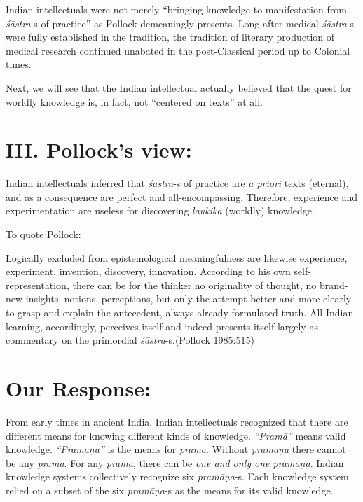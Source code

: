 Indian intellectuals were not merely ``bringing knowledge to manifestation from {\sl śāstra}-s of practice'' as Pollock demeaningly presents.  Long after medical {\sl śāstra}-s were fully established in the tradition, the tradition of literary production of medical research continued unabated in the post-Classical period up to Colonial times.

\newpage

Next, we will see that the Indian intellectual actually believed that the quest for worldly knowledge is, in fact, not ``centered on texts'' at all.

\section*{III. Pollock's view:}

Indian intellectuals inferred that {{\sl śāstra}\relax}-s of practice are {\sl a priori} texts (eternal), and as a consequence are perfect and all-encompassing.  Therefore, experience and experimentation are useless for discovering {{\sl laukika}\relax} (worldly) knowledge.

To quote Pollock:
\begin{myquote}
Logically excluded from epistemological meaningfulness are likewise experience, experiment, invention, discovery, innovation.  According to his own self-representation, there can be for the thinker no originality of thought, no brand-new insights, notions, perceptions, but only the attempt better and more clearly to grasp and explain the antecedent, always already formulated truth. All Indian learning, accordingly, perceives itself and indeed presents itself largely as commentary on the primordial {\sl śāstra}-s.\hfill (Pollock 1985:515)
\end{myquote}

\section*{Our Response:}

From early times in ancient India, Indian intellectuals recognized that there are different means for knowing different kinds of knowledge. {\sl ``Pramā''} means valid knowledge.  {\sl ``Pramāṇa''} is the means for {\sl pramā}.  Without {\sl pramāṇa} there cannot be any {\sl pramā}.  For any {\sl pramā}, there can be {\sl one and only one pramāṇa}.  Indian knowledge systems collectively recognize six {\sl pramāṇa}-s. Each knowledge system relied on a subset of the six {\sl pramāṇa}-s as the means for its valid knowledge.

